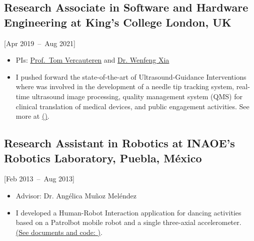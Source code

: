 \documentclass{mycv}
\begin{document}
\subsection{Research Associate in Software and Hardware Engineering at King's College London, UK}[Apr 2019~--~Aug 2021]
\begin{itemize}
  \item PIs: \href{https://cai4cai.ml}{Prof.~Tom Vercauteren} and  \href{https://www.purlkcl.org/}{Dr. Wenfeng Xia} 
  \item 
I pushed forward the state-of-the-art of Ultrasound-Guidance Interventions
	where was involved in the development of a needle tip tracking system, real-time ultrasound image processing, 
	quality management system (QMS) for clinical translation of medical devices, and public engagement activities.
	See more at \href{https://cai4cai.ml/author/miguel-xochicale/}{(\faExternalLink)}.
\end{itemize}


\subsection{Research Assistant in Robotics at INAOE's Robotics Laboratory, Puebla, M\'exico}[Feb 2013~--~Aug 2013]
\begin{itemize}
\item Advisor: Dr. Ang\'elica Mu\~noz Mel\'endez
\item I developed a Human-Robot Interaction application for dancing activities based on a Patrolbot mobile robot and a single three-axial accelerometer. 
\href{https://sites.google.com/site/perezxochicale/projects/demodance}{(See documents and code: \faExternalLink)}.
\end{itemize}
\end{document}
